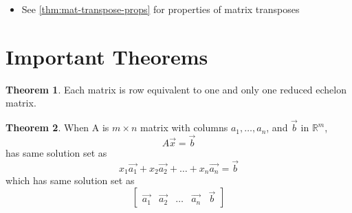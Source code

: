 \documentclass[a4paper,12pt]{article}
\theoremstyle{definition}
\newtheorem{theorem}{Theorem}
\theoremstyle{definition}
\newtheorem{example}{Example}[subsection]
\newcommand{\mateq}[3]{#1#2 = #3}
\begin{document}
\begin{itemize}
\begin{itemize}
			\begin{example}
				$\begin{bmatrix}
					1 & 7 & 9\\
					6 & 4 & 2\\
					3 & 4 & 3
				\end{bmatrix}^T
				=
				\begin{bmatrix}
					1 & 6 & 3\\
					7 & 4 & 4\\
					9 & 2 & 3
				\end{bmatrix}$
			\end{example}
			
			\item See \autoref{thm:mat-transpose-props} for properties of matrix transposes
		\end{itemize} 
	\end{itemize}
	\newpage
	
	\section{Important Theorems}
	\begin{theorem}
		Each matrix is row equivalent to one and only one reduced echelon matrix.
	\end{theorem}
	
	\begin{theorem}
		\label{thm:A-x-b-thm}
		When A is $m \times n$ matrix with columns $a_1,\ldots,a_n$, and $\vec{b}$ in $\mathbb{R}^m$,
		\begin{equation*}
			\mateq{A}{\vec{x}}{\vec{b}}
		\end{equation*}
		has same solution set as
		\begin{equation*}
			x_1\vec{a_1} + x_2\vec{a_2} + \ldots + x_n\vec{a_n} = \vec{b}
		\end{equation*}
		which has same solution set as 
		\begin{equation*}
			\begin{bmatrix}
				\vec{a_1} & \vec{a_2} & \ldots & \vec{a_n} & \vec{b}
			\end{bmatrix}
		\end{equation*}
	\end{theorem}
	
\end{document}
